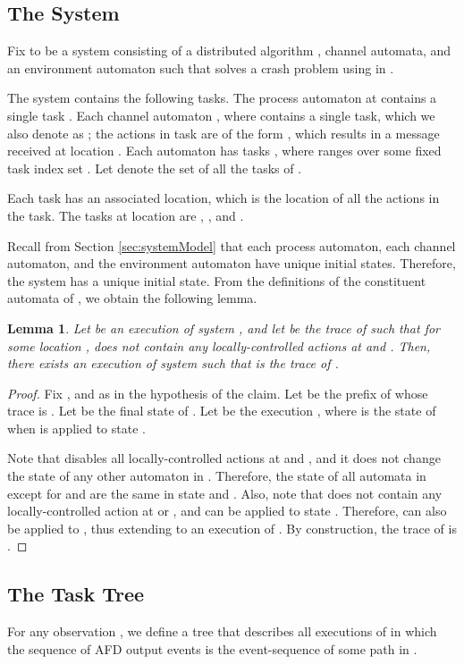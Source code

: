 \documentclass[11pt]{article}
\numberwithin{theorem}{section}
\newtheorem{lemma}[theorem]{Lemma}
\begin{document}
\subsection{The System}\label{subsec:TreeExecutionSystem}

Fix  to be a system consisting of a distributed algorithm , channel
automata, and an environment automaton  such that  solves
a crash problem  using  in . 


The system  contains the following tasks.
The process automaton at  contains a single task . 
Each channel automaton , where 
contains a single task, which we also denote as ;  the actions in task  are of the form , which results in a message received at location . 
Each automaton  has tasks , where  ranges
over some fixed task index set .
Let  denote the set of all the tasks of .

Each task has an associated location, which is the location of all the
actions in the task.
The tasks at location  are , , 
and .


Recall from Section \ref{sec:systemModel} that each process automaton, each channel automaton, and the environment automaton have unique initial states. Therefore, the system  has a unique initial state. From the definitions of the constituent automata of , we obtain the following lemma.

\begin{lemma}\label{lem:addCrashAfterLastEvent}
 Let  be an execution of system , and let  be the trace of  such that for some location ,  does not contain any locally-controlled actions at  and . Then, there exists an execution  of system  such that  is the trace of . 
\end{lemma}
\begin{proof}
Fix ,  and  as in the hypothesis of the claim.
Let  be the prefix of  whose trace is . Let  be the final state of .
Let  be the execution , where  is the state of  when  is applied to state .

Note that  disables all locally-controlled actions at  and , and it does not change the state of any other automaton in . Therefore, the state of all automata in  except for  and  are the same in state  and . Also, note that  does not contain any locally-controlled action at  or , and  can be applied to state . Therefore,  can also be applied to , thus extending  to an execution  of . By construction, the trace  of  is .
\end{proof}



\subsection{The Task Tree}\label{subsec:taskTree}
For any observation , we define a tree  that describes all executions of 
in which the sequence of AFD output events is the event-sequence of
some path in .
\end{document}
